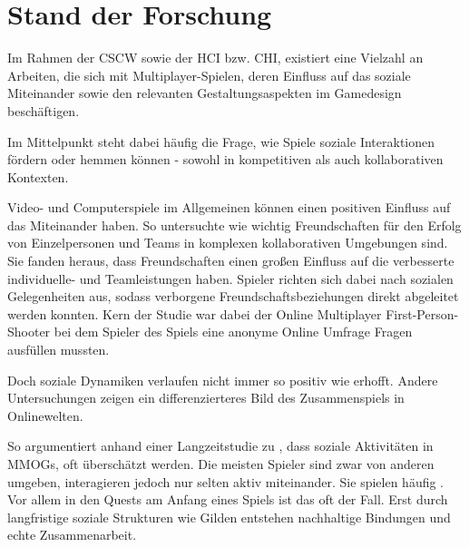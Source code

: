 \chapter{Stand der Forschung}\label{sec:related-works}


Im Rahmen der \ac{CSCW} sowie der \ac{HCI} bzw. \ac{CHI}, existiert eine Vielzahl an Arbeiten, die sich mit Multiplayer-Spielen, deren Einfluss auf das soziale Miteinander sowie den relevanten Gestaltungsaspekten im Gamedesign beschäftigen.

Im Mittelpunkt steht dabei häufig die Frage, wie Spiele soziale Interaktionen fördern oder hemmen können - sowohl in kompetitiven als auch kollaborativen Kontexten.

Video- und Computerspiele im Allgemeinen können einen positiven Einfluss auf das Miteinander haben. So untersuchte \cite{mason_friends_2013} wie wichtig Freundschaften für den Erfolg von Einzelpersonen und Teams in komplexen kollaborativen Umgebungen sind. Sie fanden heraus, dass Freundschaften einen großen Einfluss auf die verbesserte individuelle- und Teamleistungen haben. Spieler richten sich dabei nach sozialen Gelegenheiten aus, sodass verborgene Freundschaftsbeziehungen direkt abgeleitet werden konnten. Kern der Studie war dabei der Online Multiplayer First-Person-Shooter  bei dem Spieler des Spiels eine anonyme Online Umfrage Fragen ausfüllen mussten. 

Doch soziale Dynamiken verlaufen nicht immer so positiv wie erhofft. Andere Untersuchungen zeigen ein differenzierteres Bild des Zusammenspiels in Onlinewelten.

So argumentiert \cite{ducheneaut_alone_2006} anhand einer Langzeitstudie zu , dass soziale Aktivitäten in \ac{MMOG}s, oft überschätzt werden. Die meisten Spieler sind zwar von anderen umgeben, interagieren jedoch nur selten aktiv miteinander. Sie spielen häufig . Vor allem in den Quests am Anfang eines Spiels  ist das oft der Fall. Erst durch langfristige soziale Strukturen wie Gilden entstehen nachhaltige Bindungen und echte Zusammenarbeit.

